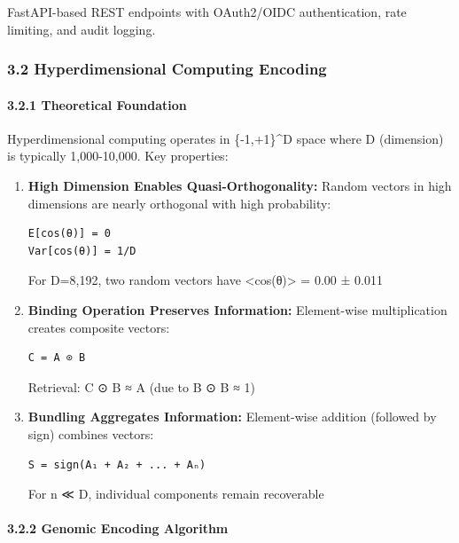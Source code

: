 \documentclass[
  11pt,
]{article}
\begin{document}
FastAPI-based REST endpoints with OAuth2/OIDC authentication, rate
limiting, and audit logging.

\subsubsection{3.2 Hyperdimensional Computing
Encoding}\label{hyperdimensional-computing-encoding}

\paragraph{3.2.1 Theoretical Foundation}\label{theoretical-foundation}

Hyperdimensional computing operates in \{-1,+1\}\^{}D space where D
(dimension) is typically 1,000-10,000. Key properties:

\begin{enumerate}
\def\labelenumi{\arabic{enumi}.}
\item
  \textbf{High Dimension Enables Quasi-Orthogonality:} Random vectors in
  high dimensions are nearly orthogonal with high probability:

\begin{verbatim}
E[cos(θ)] = 0
Var[cos(θ)] = 1/D
\end{verbatim}

  For D=8,192, two random vectors have \textless cos(θ)\textgreater{} =
  0.00 ± 0.011
\item
  \textbf{Binding Operation Preserves Information:} Element-wise
  multiplication creates composite vectors:

\begin{verbatim}
C = A ⊙ B
\end{verbatim}

  Retrieval: C ⊙ B ≈ A (due to B ⊙ B ≈ 1)
\item
  \textbf{Bundling Aggregates Information:} Element-wise addition
  (followed by sign) combines vectors:

\begin{verbatim}
S = sign(A₁ + A₂ + ... + Aₙ)
\end{verbatim}

  For n ≪ D, individual components remain recoverable
\end{enumerate}

\paragraph{3.2.2 Genomic Encoding
Algorithm}\label{genomic-encoding-algorithm}
\end{document}
